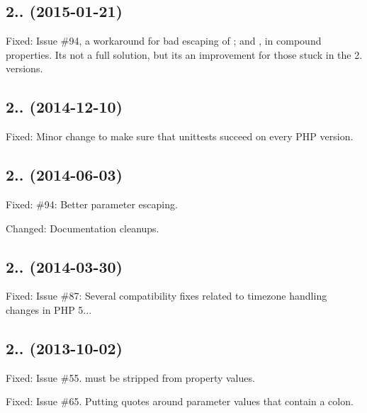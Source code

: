 \subsection*{2.. (2015-\/01-\/21) }


\begin{DoxyItemize}
\item Fixed\+: Issue \#94, a workaround for bad escaping of ; and , in compound properties. It\textquotesingle{}s not a full solution, but it\textquotesingle{}s an improvement for those stuck in the 2. versions.
\end{DoxyItemize}

\subsection*{2.. (2014-\/12-\/10) }


\begin{DoxyItemize}
\item Fixed\+: Minor change to make sure that unittests succeed on every P\+HP version.
\end{DoxyItemize}

\subsection*{2.. (2014-\/06-\/03) }


\begin{DoxyItemize}
\item Fixed\+: \#94\+: Better parameter escaping.
\item Changed\+: Documentation cleanups.
\end{DoxyItemize}

\subsection*{2.. (2014-\/03-\/30) }


\begin{DoxyItemize}
\item Fixed\+: Issue \#87\+: Several compatibility fixes related to timezone handling changes in P\+HP 5...
\end{DoxyItemize}

\subsection*{2.. (2013-\/10-\/02) }


\begin{DoxyItemize}
\item Fixed\+: Issue \#55.  must be stripped from property values.
\item Fixed\+: Issue \#65. Putting quotes around parameter values that contain a colon.
\end{DoxyItemize}

